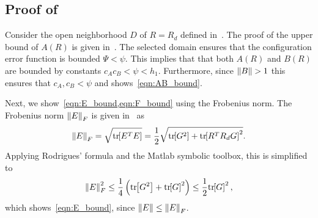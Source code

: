 \documentclass[10pt,fleqn]{IJCAS}  %
\begin{document}
\begin{multicols}{2}
\subsection{Proof of~}\label{proof:eR_dot_bound}


Consider the open neighborhood $D$ of $R=R_d$ defined in~.
The proof of the upper bound of \( A(R) \) is given in~\cite{LeeITCST13}.
The selected domain ensures that the configuration error function is bounded \( \Psi < \psi \).
This implies that that both \( A(R) \) and \( B(R) \) are bounded by constants \( c_A c_B < \psi < h_1\).
Furthermore, since \( \left\| B \right\| > 1 \) this ensures that \( c_A, c_B < \psi\) and shows~\cref{eqn:AB_bound}.

Next, we show~\cref{eqn:E_bound,eqn:F_bound} using the Frobenius norm.
The Frobenius norm \( \left\| E \right\|_F \) is given in~\cite{LeeITCST13} as
\begin{gather*}
	\left\| E \right\|_F = \sqrt{\mathrm{tr}\negthickspace\left[ E^T E \right]} = \frac{1}{2} \sqrt{\mathrm{tr}\negthickspace\left[ G^2 \right] + \mathrm{tr}\negthickspace\left[ R^T R_d G \right]^2} .
\end{gather*}
Applying Rodrigues' formula and the Matlab symbolic toolbox, this is simplified to
\begin{gather*}
	\left\| E \right\|^2_F \leq \frac{1}{4} \left( \mathrm{tr}\negthickspace\left[ G^2 \right] + \mathrm{tr}\negthickspace\left[ G \right]^2 \right) \leq \frac{1}{2} \mathrm{tr}\negthickspace\left[ G \right]^2 ,
\end{gather*}
which shows~\cref{eqn:E_bound}, since \( \left\| E \right\| \leq \left\| E \right\|_F \).


\end{multicols}
\end{document}
